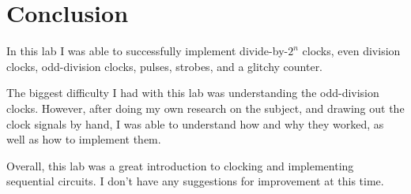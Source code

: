 \documentclass{article}
\begin{document}
\section{Conclusion}
In this lab I was able to successfully implement divide-by-$2^n$ clocks, even division clocks, odd-division clocks, pulses, strobes, and a glitchy counter.

The biggest difficulty I had with this lab was understanding the odd-division clocks. However, after doing my own research on the subject, and drawing out the clock signals by hand, I was able to understand how and why they worked, as well as how to implement them.

Overall, this lab was a great introduction to clocking and implementing sequential circuits. I don't have any suggestions for improvement at this time.
\end{document}
